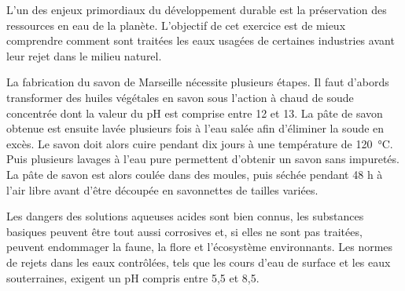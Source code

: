 

{}

\medskip
L'un des enjeux primordiaux du développement durable est la préservation des ressources en eau de la planète.
L'objectif de cet exercice est de mieux comprendre comment sont traitées les eaux usagées de certaines industries avant leur rejet dans le milieu naturel.

\medskip
La fabrication du savon de Marseille nécessite plusieurs étapes. %
Il faut d'abords transformer des huiles végétales en savon sous l'action à chaud de soude concentrée dont la valeur du pH est comprise entre 12 et 13.
La pâte de savon obtenue est ensuite lavée plusieurs fois à l'eau salée afin d'éliminer la soude en excès.
Le savon doit alors cuire pendant dix jours à une température de \qty{120}{\degreeCelsius}.
Puis plusieurs lavages à l'eau pure permettent d'obtenir un savon sans impuretés.
La pâte de savon est alors coulée dans des moules, puis séchée pendant 48 h à l'air libre avant d'être découpée en savonnettes de tailles variées.

\medskip
Les dangers des solutions aqueuses acides sont bien connus, les substances basiques peuvent être tout aussi corrosives et, si elles ne sont pas traitées, peuvent endommager la faune, la flore et l'écosystème environnants.
Les normes de rejets dans les eaux contrôlées, tels que les cours d'eau de surface et les eaux souterraines, exigent un pH compris entre 5,5 et 8,5.




